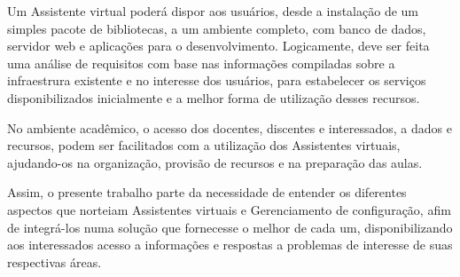 \documentclass[quali]{mpit}
\begin{document}
Um Assistente virtual poderá dispor aos usuários, desde a  instalação de um simples pacote de bibliotecas, a um ambiente completo, com banco de dados, servidor web e aplicações para o desenvolvimento. Logicamente, deve ser feita uma análise de requisitos com base nas informações compiladas sobre a infraestrura existente e no interesse dos usuários,  para estabelecer os serviços disponibilizados inicialmente e a melhor forma de utilização desses recursos.

No ambiente acadêmico, o acesso dos docentes, discentes e interessados, a dados e recursos, podem ser facilitados com a utilização dos Assistentes virtuais, ajudando-os na organização, provisão de recursos e na preparação das aulas.

Assim, o presente trabalho parte da necessidade de entender os diferentes aspectos que norteiam Assistentes virtuais e Gerenciamento de configuração, afim de integrá-los numa solução que fornecesse o melhor de cada um, disponibilizando aos interessados acesso a informações e respostas a problemas de interesse de suas respectivas áreas.
\end{document}
